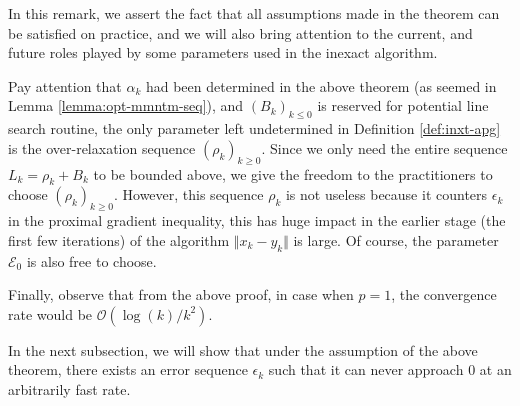 \documentclass[12pt]{article}
\begin{document}
        \begin{remark}
            In this remark, we assert the fact that all assumptions made in the theorem can be satisfied on practice, and we will also bring attention to the current, and future roles played by some parameters used in the inexact algorithm. 
            \par
            Pay attention that $\alpha_k$ had been determined in the above theorem (as seemed in Lemma \ref{lemma:opt-mmntm-seq}), and $(B_k)_{k \le 0}$ is reserved for potential line search routine, the only parameter left undetermined in Definition \ref{def:inxt-apg} is the over-relaxation sequence $(\rho_k)_{k \ge 0}$.
            Since we only need the entire sequence $L_k = \rho_k + B_k$ to be bounded above, we give the freedom to the practitioners to choose $(\rho_k)_{k \ge 0}$. 
            However, this sequence $\rho_k$ is not useless because it counters $\epsilon_k$ in the proximal gradient inequality, this has huge impact in the earlier stage (the first few iterations) of the algorithm $\Vert x_k - y_k\Vert$ is large. 
            Of course, the parameter $\mathcal E_0$ is also free to choose. 
            \par
            Finally, observe that from the above proof, in case when $p = 1$, the convergence rate would be $\mathcal O(\log(k)/k^2)$. 
        \end{remark}
        In the next subsection, we will show that under the assumption of the above theorem, there exists an error sequence $\epsilon_k$ such that it can never approach $0$ at an arbitrarily fast rate. 
\end{document}
